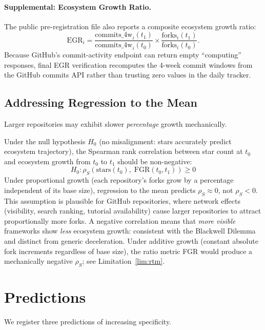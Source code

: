 \documentclass[12pt]{article}
\begin{document}
\paragraph{Supplemental: Ecosystem Growth Ratio.}
The public pre-registration file also reports a composite ecosystem growth ratio:
\[
\text{EGR}_i =
\frac{\text{commits\_4w}_i(t_1)}{\text{commits\_4w}_i(t_0)}
\times
\frac{\text{forks}_i(t_1)}{\text{forks}_i(t_0)}.
\]
Because GitHub's commit-activity endpoint can return empty ``computing'' responses, final EGR verification recomputes the 4-week commit windows from the GitHub commits API rather than trusting zero values in the daily tracker.

\subsection{Addressing Regression to the Mean}

Larger repositories may exhibit slower \emph{percentage} growth mechanically.

Under the null hypothesis $H_0$ (no misalignment: stars accurately predict ecosystem trajectory), the Spearman rank correlation between star count at $t_0$ and ecosystem growth from $t_0$ to $t_1$ should be non-negative:
\[
H_0: \rho_S(\text{stars}(t_0),\; \text{FGR}(t_0, t_1)) \geq 0
\]
Under proportional growth (each repository's forks grow by a percentage independent of its base size), regression to the mean predicts $\rho_S \approx 0$, not $\rho_S < 0$. This assumption is plausible for GitHub repositories, where network effects (visibility, search ranking, tutorial availability) cause larger repositories to attract proportionally more forks. A negative correlation means that \emph{more visible} frameworks show \emph{less} ecosystem growth: consistent with the Blackwell Dilemma and distinct from generic deceleration. Under additive growth (constant absolute fork increments regardless of base size), the ratio metric FGR would produce a mechanically negative $\rho_S$; see Limitation~\ref{lim:rtm}.

\section{Predictions}

We register three predictions of increasing specificity.
\end{document}

